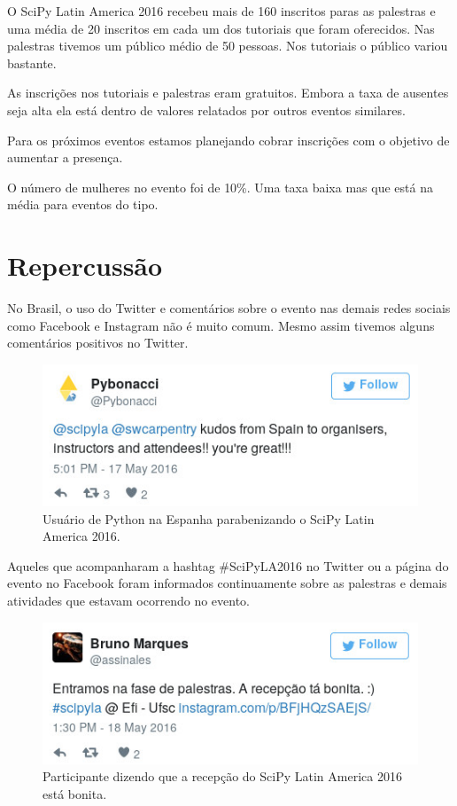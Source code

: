 \documentclass[12pt]{article}
\begin{document}
O SciPy Latin America 2016 recebeu mais de 160 inscritos paras as palestras e
uma média de 20 inscritos em cada um dos tutoriais que foram oferecidos.
Nas palestras tivemos um público médio de 50 pessoas. Nos tutoriais o público
variou bastante.

As inscrições nos tutoriais e palestras eram gratuitos. Embora a taxa de
ausentes seja alta ela está dentro de valores relatados por outros eventos
similares.

Para os próximos eventos estamos planejando cobrar inscrições com o objetivo de
aumentar a presença.

O número de mulheres no evento foi de 10\%. Uma taxa baixa mas que está na média
para eventos do tipo.

\clearpage
\newpage

\section*{Repercussão}

No Brasil, o uso do Twitter e comentários sobre o evento nas demais redes
sociais como Facebook e Instagram não é muito comum. Mesmo assim tivemos alguns
comentários positivos no Twitter.

\begin{figure}[!htb]
\center
\includegraphics[height=.3\textheight]{tweet-kudos.jpg}
\caption{Usuário de Python na Espanha parabenizando o SciPy Latin America 2016.}
\end{figure}

Aqueles que acompanharam a hashtag \#SciPyLA2016 no Twitter ou a página do
evento no Facebook foram informados continuamente sobre as palestras e demais
atividades que estavam ocorrendo no evento.

\begin{figure}[!htb]
\center
\includegraphics[height=.3\textheight]{tweet-recepcao.jpg}
\caption{Participante dizendo que a recepção do SciPy Latin America 2016 está
bonita.}
\end{figure}
\end{document}
